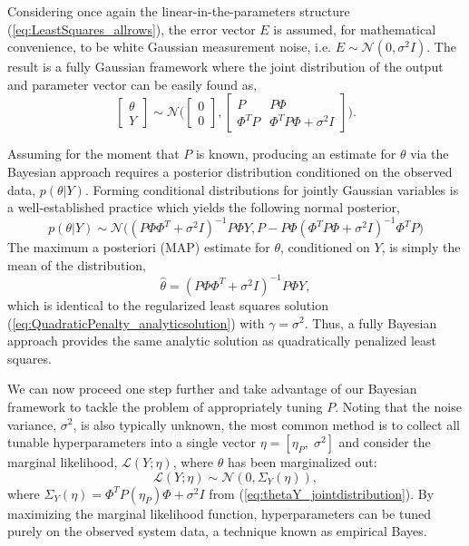 Considering once again the linear-in-the-parameters structure (\ref{eq:LeastSquares_allrows}), the error vector $E$ is assumed, for mathematical convenience, to be white Gaussian measurement noise, i.e. $E \sim \mathcal{N}(0,\sigma^2 I)$. The result is a fully Gaussian framework where the joint distribution of the output and parameter vector can be easily found as,
\begin{equation}
\begin{bmatrix}
\theta \\ 
Y
\end{bmatrix} \sim \mathcal{N} \Bigg(
\begin{bmatrix}
0\\ 
0
\end{bmatrix},
\begin{bmatrix}
P & P \Phi\\ 
\Phi^T P & \Phi^T P \Phi + \sigma^2 I 
\end{bmatrix} \Bigg).
\label{eq:thetaY_jointdistribution}
\end{equation}

Assuming for the moment that $P$ is known, producing an estimate for $\theta$ via the Bayesian approach requires a posterior distribution conditioned on the observed data, $p(\theta|Y)$. Forming conditional distributions for jointly Gaussian variables is a well-established practice which yields the following normal posterior,
\begin{equation}
p(\theta|Y) \sim \mathcal{N} \Bigg( (P \Phi \Phi^T + \sigma^2 I)^{-1} P \Phi Y, P - P \Phi (\Phi^T P \Phi + \sigma^2 I)^{-1} \Phi^T P \Bigg)
\end{equation}
The maximum a posteriori (MAP) estimate for $\theta$, conditioned on $Y$, is simply the mean of the distribution,
\begin{equation}
\hat{\theta} = (P \Phi \Phi^T + \sigma^2 I)^{-1} P \Phi Y,
\label{eq:MLE_BayesianRegularization}
\end{equation}
which is identical to the regularized least squares solution (\ref{eq:QuadraticPenalty_analyticsolution}) with $\gamma = \sigma^2$. Thus, a fully Bayesian approach provides the same analytic solution as quadratically penalized least squares. 

We can now proceed one step further and take advantage of our Bayesian framework to tackle the problem of appropriately tuning $P$. Noting that the noise variance, $\sigma^2$, is also typically unknown, the most common method is to collect all tunable hyperparameters into a single vector $\eta = [\eta_P, \; \sigma^2]$ and consider the marginal likelihood, $\mathcal{L}(Y;\eta)$, where $\theta$ has been marginalized out:
\begin{equation}
\mathcal{L}(Y;\eta) \sim \mathcal{N}(0, \Sigma_Y(\eta)),
\label{eq:MarginalLikelihoodDist_eta}
\end{equation}
where $\Sigma_Y(\eta) = \Phi^T P(\eta_P) \Phi + \sigma^2 I $ from (\ref{eq:thetaY_jointdistribution}). By maximizing the marginal likelihood function, hyperparameters can be tuned purely on the observed system data, a technique known as empirical Bayes. 

